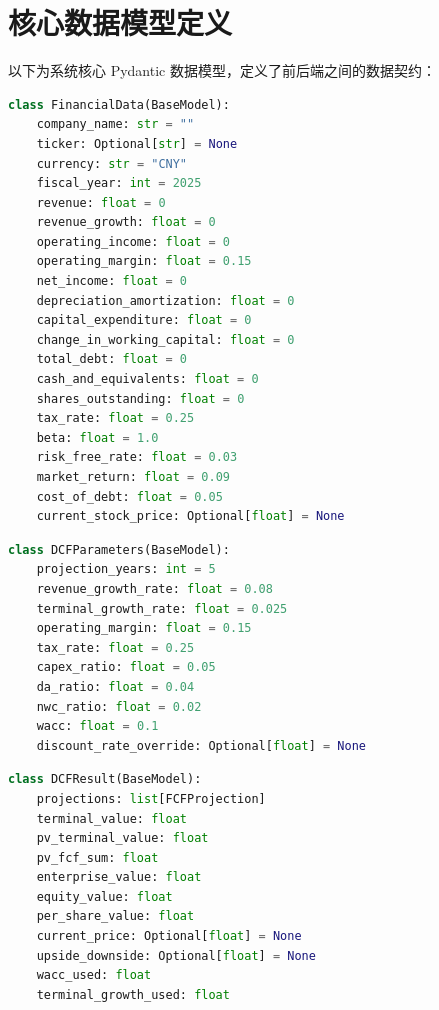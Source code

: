 \documentclass[12pt,a4paper]{article}
\begin{document}
\appendix
\section{核心数据模型定义}

以下为系统核心 Pydantic 数据模型，定义了前后端之间的数据契约：

\begin{lstlisting}[language=Python,caption=FinancialData 模型]
class FinancialData(BaseModel):
    company_name: str = ""
    ticker: Optional[str] = None
    currency: str = "CNY"
    fiscal_year: int = 2025
    revenue: float = 0
    revenue_growth: float = 0
    operating_income: float = 0
    operating_margin: float = 0.15
    net_income: float = 0
    depreciation_amortization: float = 0
    capital_expenditure: float = 0
    change_in_working_capital: float = 0
    total_debt: float = 0
    cash_and_equivalents: float = 0
    shares_outstanding: float = 0
    tax_rate: float = 0.25
    beta: float = 1.0
    risk_free_rate: float = 0.03
    market_return: float = 0.09
    cost_of_debt: float = 0.05
    current_stock_price: Optional[float] = None
\end{lstlisting}

\begin{lstlisting}[language=Python,caption=DCFParameters 模型]
class DCFParameters(BaseModel):
    projection_years: int = 5
    revenue_growth_rate: float = 0.08
    terminal_growth_rate: float = 0.025
    operating_margin: float = 0.15
    tax_rate: float = 0.25
    capex_ratio: float = 0.05
    da_ratio: float = 0.04
    nwc_ratio: float = 0.02
    wacc: float = 0.1
    discount_rate_override: Optional[float] = None
\end{lstlisting}

\begin{lstlisting}[language=Python,caption=DCFResult 模型]
class DCFResult(BaseModel):
    projections: list[FCFProjection]
    terminal_value: float
    pv_terminal_value: float
    pv_fcf_sum: float
    enterprise_value: float
    equity_value: float
    per_share_value: float
    current_price: Optional[float] = None
    upside_downside: Optional[float] = None
    wacc_used: float
    terminal_growth_used: float
\end{lstlisting}
\end{document}
